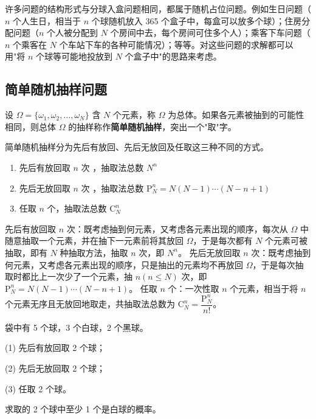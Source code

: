 ﻿\documentclass[lang=cn,11pt]{elegantbook}
\begin{document}
\begin{note}
许多问题的结构形式与分球入盒问题相同，都属于随机占位问题。例如生日问题（\(n\) 个人生日，相当于 \(n\) 个球随机放入 365 个盒子中，每盒可以放多个球）；住房分配问题（\(n\) 个人被分配到 \(N\) 个房间中去，每个房间可住多个人）；乘客下车问题（\(n\) 个乘客在 \(N\) 个车站下车的各种可能情况）；等等。对这些问题的求解都可以用"将 \(n\) 个球等可能地投放到 \(N\) 个盒子中"的思路来考虑。
\end{note}

\subsection*{简单随机抽样问题}

设 \(\Omega = \{\omega_1, \omega_2, \dots, \omega_N\}\) 含 \(N\) 个元素，称 \(\Omega\) 为总体。如果各元素被抽到的可能性相同，则总体 \(\Omega\) 的抽样称作\textbf{简单随机抽样}，突出一个"取"字。

简单随机抽样分为先后有放回、先后无放回及任取这三种不同的方式。

\begin{enumerate}
  \item 先后有放回取 \(n\) 次 ，抽取法总数 \(N^n\) 
  \item 先后无放回取 \(n\) 次 ，抽取法总数 \(\mathrm{P}_N^n = N(N-1)\cdots(N-n+1)\)
  \item 任取 \(n\) 个，抽取法总数 \(\mathrm{C}_N^n\)
\end{enumerate}

\begin{note}
先后有放回取 \(n\) 次：既考虑抽到何元素，又考虑各元素出现的顺序，每次从 \(\Omega\) 中随意抽取一个元素，并在抽下一元素前将其放回 \(\Omega\)，于是每次都有 \(N\) 个元素可被抽取，即有 \(N\) 种抽取方法，抽取 \(n\) 次，即 \(N^n\)。\newline
先后无放回取 \(n\) 次：既考虑抽到何元素，又考虑各元素出现的顺序，只是抽出的元素均不再放回 \(\Omega\)，于是每次抽取时都比上一次少了一个元素，抽 \(n(n\le N)\) 次，即 \(\mathrm{P}_N^n = N(N-1)\cdots(N-n+1)\)。\newline
任取 \(n\) 个：一次性取 \(n\) 个元素，相当于将 \(n\) 个元素无序且无放回地取走，共抽取法总数为 \(\mathrm{C}_N^n = \dfrac{\mathrm{P}_N^n}{n!}\)。
\end{note}

\begin{exercise}\label{exer:1-5}
袋中有 5 个球，3 个白球，2 个黑球。\par
(1) 先后有放回取 2 个球；\par
(2) 先后无放回取 2 个球；\par
(3) 任取 2 个球。\par
求取的 2 个球中至少 1 个是白球的概率。
\end{exercise}
\end{document}
